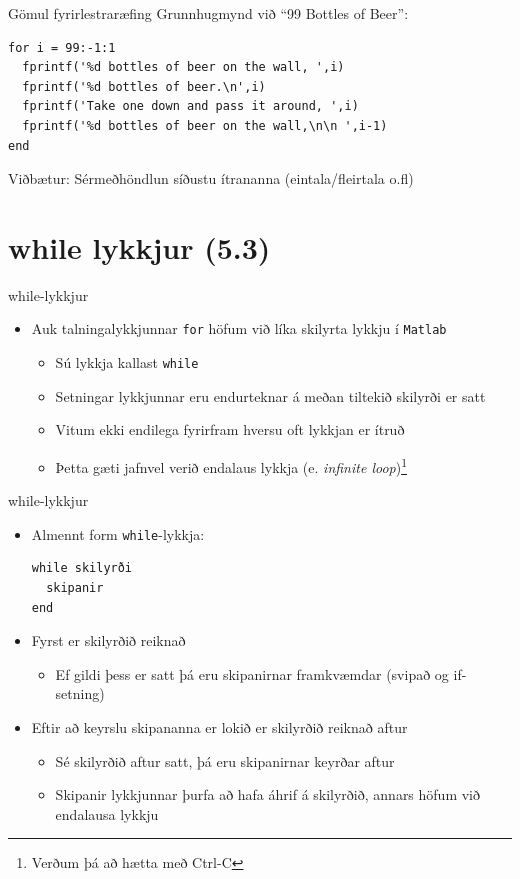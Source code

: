 \documentclass{beamer}
\begin{document}
\begin{frame}[fragile]{Gömul fyrirlestraræfing}
\vspace{\baselineskip}
Grunnhugmynd við ``99 Bottles of Beer'':
\begin{verbatim}
for i = 99:-1:1
  fprintf('%d bottles of beer on the wall, ',i)
  fprintf('%d bottles of beer.\n',i)
  fprintf('Take one down and pass it around, ',i)
  fprintf('%d bottles of beer on the wall,\n\n ',i-1)
end
\end{verbatim}
Viðbætur: Sérmeðhöndlun síðustu ítrananna (eintala/fleirtala o.fl)
\end{frame}

\section{while lykkjur (5.3)}

\begin{frame}{while-lykkjur}
\begin{itemize}
 \item Auk talningalykkjunnar \texttt{for} höfum við líka skilyrta lykkju í \texttt{Matlab}
 \begin{itemize}
  \item Sú lykkja kallast \texttt{while}
  \item Setningar lykkjunnar eru endurteknar á meðan tiltekið skilyrði er satt
  \item Vitum ekki endilega fyrirfram hversu oft lykkjan er ítruð
  \item Þetta gæti jafnvel verið endalaus lykkja (e. \emph{infinite loop})\footnote{Verðum þá að hætta með Ctrl-C}
 \end{itemize}
\end{itemize}
\end{frame}

\begin{frame}[fragile]{while-lykkjur}
\begin{itemize}
 \item Almennt form \texttt{while}-lykkja:
\begin{verbatim}
while skilyrði
  skipanir
end
\end{verbatim}
\pause
 \item Fyrst er skilyrðið reiknað
 \begin{itemize}
  \item Ef gildi þess er satt þá eru skipanirnar framkvæmdar (svipað og if-setning)
 \end{itemize}
 \item Eftir að keyrslu skipananna er lokið er skilyrðið reiknað aftur
 \begin{itemize}
  \item Sé skilyrðið aftur satt, þá eru skipanirnar keyrðar aftur
  \item Skipanir lykkjunnar þurfa að hafa áhrif á skilyrðið, annars höfum við endalausa lykkju
 \end{itemize}
\end{itemize}
\end{frame}
\end{document}
